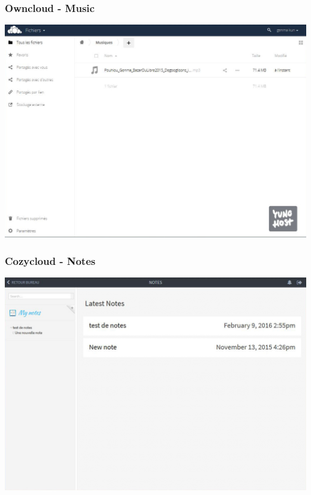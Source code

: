 \documentclass{beamer}
\begin{document}
\begin{frame}
\frametitle{Owncloud - Music}
\includegraphics[scale=0.3] {./Owncloud/Owncloud_Musiques.jpg}
\end{frame}

\begin{frame}
\frametitle{Cozycloud - Notes}
\includegraphics[scale=0.3] {./CozyCloud/CozyCloud_Notes.jpg}
\end{frame}
\end{document}

